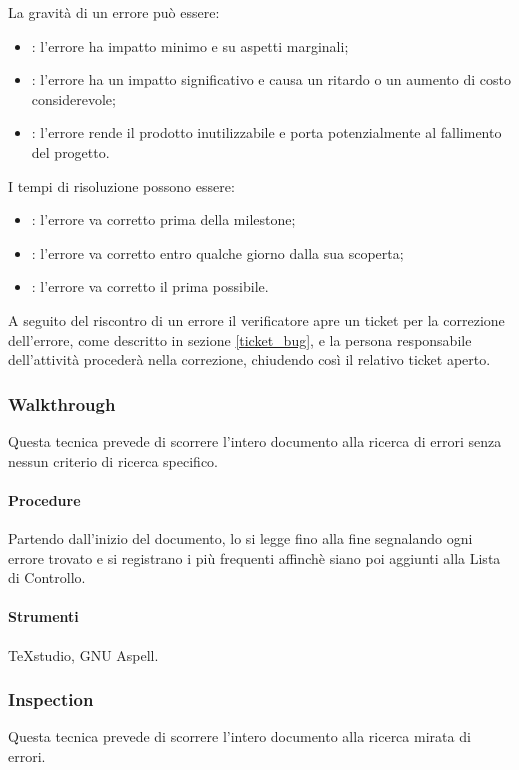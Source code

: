 La gravità di un errore può essere:

\begin{itemize}
\item {}: l'errore ha impatto minimo e su aspetti marginali;
\item {}: l'errore ha un impatto significativo e causa un ritardo o un aumento di costo considerevole;
\item {}: l'errore rende il prodotto inutilizzabile e porta potenzialmente al fallimento del progetto.
\end{itemize}

I tempi di risoluzione possono essere:
\begin{itemize}
\item {}: l'errore va corretto prima della milestone;
\item {}: l'errore va corretto entro qualche giorno dalla sua scoperta;
\item {}: l'errore va corretto il prima possibile.
\end{itemize}

A seguito del riscontro di un errore il verificatore apre un ticket per la correzione dell'errore, come descritto in sezione \ref{ticket_bug}, e la persona responsabile dell'attività procederà nella correzione, chiudendo così il relativo ticket aperto.




\subsubsection{Walkthrough}
Questa tecnica prevede di scorrere l'intero documento alla ricerca di errori senza nessun criterio di ricerca specifico.
\paragraph{Procedure}

Partendo dall'inizio del documento, lo si legge fino alla fine segnalando ogni errore trovato e si registrano i più frequenti affinchè siano poi aggiunti alla Lista di Controllo.
\paragraph{Strumenti}

TeXstudio, GNU Aspell.

\subsubsection{Inspection}
Questa tecnica prevede di scorrere l'intero documento alla ricerca mirata di errori.
